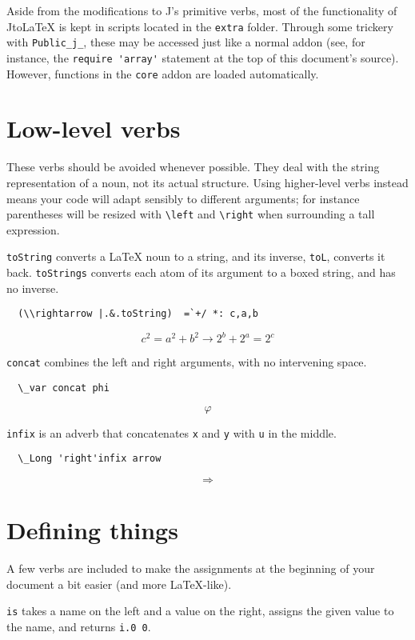 \documentclass{article}
\begin{document}
Aside from the modifications to J's primitive verbs, most of the
functionality of JtoLaTeX is kept in scripts located in the \lstinline`extra`
folder. Through some trickery with \lstinline`Public_j_`, these may be accessed
just like a normal addon (see, for instance, the \lstinline`require 'array'`
statement at the top of this document's source). However, functions in the
\lstinline`core` addon are loaded automatically.

\section{Low-level verbs}
These verbs should be avoided whenever possible. They deal with the string
representation of a noun, not its actual structure. Using higher-level
verbs instead means your code will adapt sensibly to different arguments;
for instance parentheses will be resized with \lstinline`\left` and \lstinline`\right`
when surrounding a tall expression.

\lstinline`toString` converts a LaTeX noun to a string, and its inverse, \lstinline`toL`,
converts it back. \lstinline`toStrings` converts each atom of its argument to a
boxed string, and has no inverse.
\begin{lstlisting}
  (\\rightarrow |.&.toString)  =`+/ *: c,a,b
\end{lstlisting}
\[c^2=a^2+b^2 \rightarrow 2^b+2^a=2^c\]

\lstinline`concat` combines the left and right arguments, with no intervening
space.
\begin{lstlisting}
  \_var concat phi
\end{lstlisting}
\[\varphi\]

\lstinline`infix` is an adverb that concatenates \lstinline`x` and \lstinline`y` with \lstinline`u` in
the middle.
\begin{lstlisting}
  \_Long 'right'infix arrow
\end{lstlisting}
\[\Longrightarrow\]

\section{Defining things}
A few verbs are included to make the assignments at the beginning of your
document a bit easier (and more LaTeX-like).

\lstinline`is` takes a name on the left and a value on the right, assigns the
given value to the name, and returns \lstinline`i.0 0`.
\end{document}
